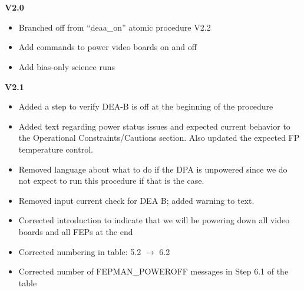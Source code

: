 \documentclass[11pt]{article}
\begin{document}
\vspace{0.15in}
\normalsize
{} \\
\normalsize

\normalsize
{} \\
\normalsize

{\bf V2.0}
\begin{itemize}
\item Branched off from ``deaa\_on'' atomic procedure V2.2
\item Add commands to power video boards on and off
\item Add bias-only science runs
\end{itemize}

{\bf V2.1}
\begin{itemize}
\item Added a step to verify DEA-B is off at the beginning of the procedure
\item Added text regarding power status issues and expected current behavior to the Operational Constraints/Cautions section. Also updated the expected FP temperature control.
\item Removed language about what to do if the DPA is unpowered since we do not expect to run this procedure if that is the case.
\item Removed input current check for DEA B; added warning to text.
\item Corrected introduction to indicate that we will be powering down all video boards and all FEPs at the end
\item Corrected numbering in table: 5.2 $\rightarrow$ 6.2
\item Corrected number of FEPMAN\_POWEROFF messages in Step 6.1 of the table
\end{itemize}
\end{document}
